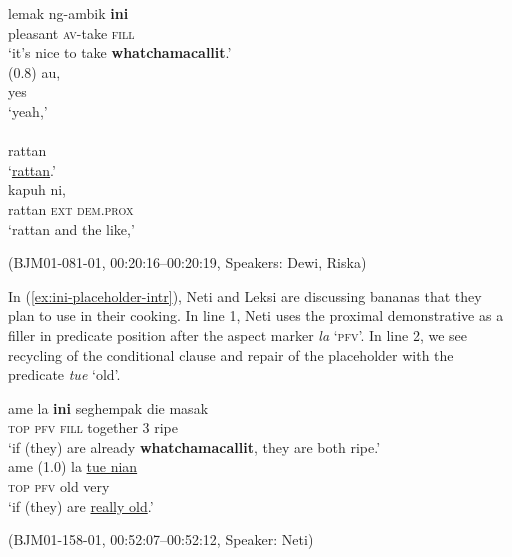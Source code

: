 \documentclass[output=paper,
\ChapterDOI{10.5281/zenodo.15697583}
colorlinks,
citecolor=brown]{langscibook}
\begin{document}
\begin{exe}
    \ex\label{ex:ini-placeholder-np-p}
    \begin{xlist}[0\quad →A:]
        \gll lemak ng-ambik \textbf{ini}\\
        pleasant \textsc{av}-take \textsc{fill}\\
        \glt `it's nice to take \textbf{whatchamacallit}.' \\
        \exi{} (0.8)
        \gll au,\\
        yes\\
        \glt `yeah,' \\
        \gll  [\uline{wi}.]\\
         rattan\\ 
        \glt `\uline{rattan}.' \\
        \gll  [wi] kapuh ni,\\
         rattan \textsc{ext} \textsc{dem.prox}\\
        \glt `rattan and the like,' \\
    \end{xlist}
    \hfill (BJM01-081-01, 00:20:16--00:20:19, Speakers: Dewi, Riska)
\end{exe}

In (\ref{ex:ini-placeholder-intr}), Neti and Leksi are discussing bananas that they plan to use in their cooking. In line 1, Neti uses the proximal demonstrative as a filler in predicate position after the aspect marker \textit{la} `\textsc{pfv}'. In line 2, we see recycling of the conditional clause and repair of the placeholder with the predicate \textit{tue} `old'.

\begin{exe}
    \ex\label{ex:ini-placeholder-intr} 
    \begin{xlist}[0\quad →A:]
        \gll ame la \textbf{ini} seghempak die masak\\
        \textsc{top} \textsc{pfv} \textsc{fill} together 3 ripe\\
        \glt `if (they) are already \textbf{whatchamacallit}, they are both ripe.'\\
        \exi{2\quad \hphantom{→N:}}
        \gll ame (1.0) la \uline{tue nian}\\
        \textsc{top} {} \textsc{pfv} {old very} \\
        \glt `if (they) are \uline{really old}.'\\
    \end{xlist}
    \hfill (BJM01-158-01, 00:52:07--00:52:12, Speaker: Neti)
\end{exe}
\end{document}
